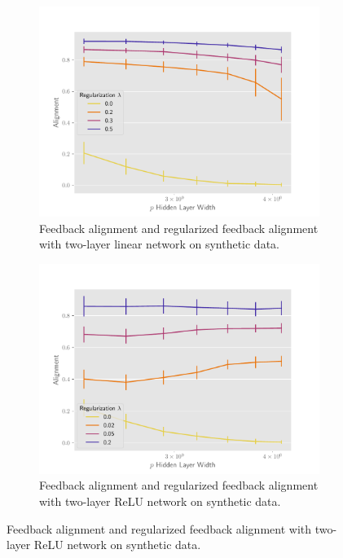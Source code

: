 \begin{figure}[h]
\centering
\begin{subfigure}[b]{.49\textwidth}
  \centering
  \includegraphics[width=\linewidth]{figures/align_lr_non_autograd_l2_v6.pdf}
  \caption{Feedback alignment and regularized feedback alignment with two-layer linear network on synthetic data.}
  \label{fig:align_lr_non_autograd_l2}
\end{subfigure}\hfill
\begin{subfigure}[b]{.49\textwidth}
  \centering
  \includegraphics[width=\linewidth]{figures/align_nn_relu_autograd_l2_v6.pdf}
  \caption{Feedback alignment and regularized feedback alignment with two-layer ReLU network on synthetic data.}
  \label{fig:align_nn_relu_autograd_l2}

\end{subfigure}
\end{figure}
